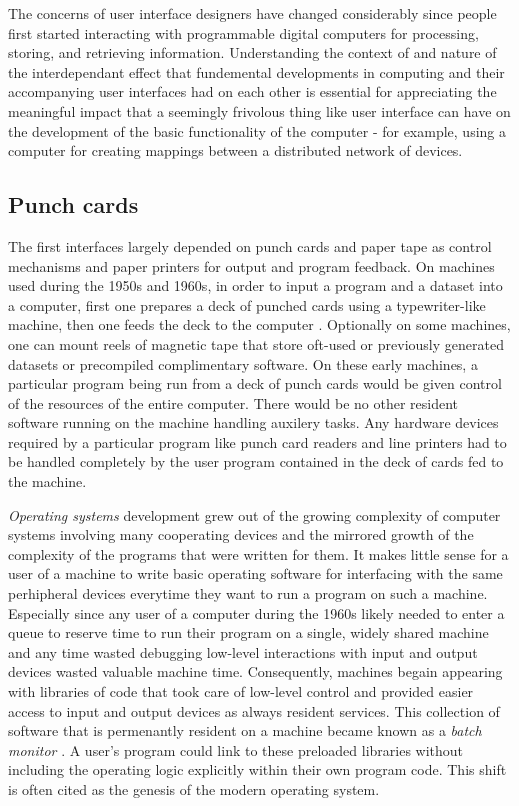 The concerns of user interface designers have changed considerably since people first started interacting with programmable digital computers for processing, storing, and retrieving information. Understanding the context of and nature of the interdependant effect that fundemental developments in computing and their accompanying user interfaces had on each other is essential for appreciating the meaningful impact that a seemingly frivolous thing like user interface can have on the development of the basic functionality of the computer - for example, using a computer for creating mappings between a distributed network of devices.  

\subsection{Punch cards}

The first interfaces largely depended on punch cards and paper tape as control mechanisms and paper printers for output and program feedback. On machines used during the 1950s and 1960s, in order to input a program and a dataset into a computer, first one prepares a deck of punched cards using a typewriter-like machine, then one feeds the deck to the computer \cite{oshistory2011}. Optionally on some machines, one can mount reels of magnetic tape that store oft-used or previously generated datasets or precompiled complimentary software. On these early machines, a particular program being run from a deck of punch cards would be given control of the resources of the entire computer. There would be no other resident software running on the machine handling auxilery tasks. Any hardware devices required by a particular program like punch card readers and line printers had to be handled completely by the user program contained in the deck of cards fed to the machine. 

\emph{Operating systems} development grew out of the growing complexity of computer systems involving many cooperating devices and the mirrored growth of the complexity of the programs that were written for them. It makes little sense for a user of a machine to write basic operating software for interfacing with the same perhipheral devices everytime they want to run a program on such a machine. Especially since any user of a computer during the 1960s likely needed to enter a queue to reserve time to run their program on a single, widely shared machine and any time wasted debugging low-level interactions with input and output devices wasted valuable machine time. Consequently, machines begain appearing with libraries of code that took care of low-level control and provided easier access to input and output devices as always resident services. This collection of software that is permenantly resident on a machine became known as a \emph{batch monitor} \cite{os2000}. A user's program could link to these preloaded libraries without including the operating logic explicitly within their own program code. This shift is often cited as the genesis of the modern operating system.

